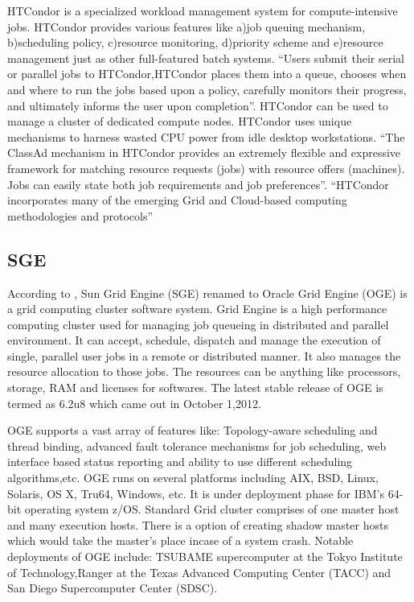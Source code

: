     
     HTCondor is a specialized workload management system for
     compute-intensive jobs.  HTCondor provides various features like
     a)job queuing mechanism, b)scheduling policy, c)resource
     monitoring, d)priority scheme and e)resource management just as
     other full-featured batch systems.  ``Users submit their serial or
     parallel jobs to HTCondor,HTCondor places them into a queue,
     chooses when and where to run the jobs based upon a policy,
     carefully monitors their progress, and ultimately informs the
     user upon completion''.  HTCondor can be used to manage a cluster
     of dedicated compute nodes. HTCondor uses unique mechanisms to
     harness wasted CPU power from idle desktop workstations. ``The
     ClassAd mechanism in HTCondor provides an extremely flexible and
     expressive framework for matching resource requests (jobs) with
     resource offers (machines).  Jobs can easily state both job
     requirements and job preferences''.  ``HTCondor incorporates many
     of the emerging Grid and Cloud-based computing methodologies and
     protocols'' \cite{htcondor}

     
\subsection{SGE}

     According to \cite{www-sge-wiki}, Sun Grid Engine (SGE) renamed
     to Oracle Grid Engine (OGE) is a grid computing cluster software
     system. Grid Engine is a high performance computing cluster used
     for managing job queueing in distributed and parallel
     environment. It can accept, schedule, dispatch and manage the
     execution of single, parallel user jobs in a remote or
     distributed manner. It also manages the resource allocation to
     those jobs. The resources can be anything like processors,
     storage, RAM and licenses for softwares. The latest stable
     release of OGE is termed as 6.2u8 which came out in October
     1,2012.

     OGE supports a vast array of features like: Topology-aware
     scheduling and thread binding, advanced fault tolerance
     mechanisms for job scheduling, web interface based status
     reporting and ability to use different scheduling
     algorithms,etc. OGE runs on several platforms including AIX, BSD,
     Linux, Solaris, OS X, Tru64, Windows, etc. It is under deployment
     phase for IBM's 64-bit operating system z/OS. Standard Grid
     cluster comprises of one master host and many execution
     hosts. There is a option of creating shadow master hosts which
     would take the master's place incase of a system crash. Notable
     deployments of OGE include: TSUBAME supercomputer at the Tokyo
     Institute of Technology,Ranger at the Texas Advanced Computing
     Center (TACC) and San Diego Supercomputer Center (SDSC).

